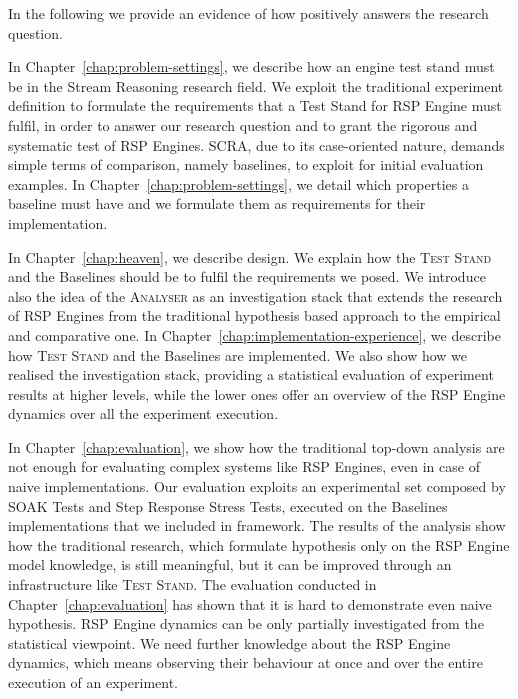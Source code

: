 \noindent In the following we provide an evidence of how \name positively answers the research question.

In Chapter~\ref{chap:problem-settings}, we describe how an engine test stand must be in the Stream Reasoning research field. We exploit the traditional experiment definition to formulate the requirements that a Test Stand for RSP Engine must fulfil, in order to answer our research question and to grant the rigorous and systematic test of RSP Engines. SCRA, due to its case-oriented nature, demands simple terms of comparison, namely baselines, to exploit for initial evaluation examples. In Chapter~\ref{chap:problem-settings}, we detail which properties a baseline must have and we formulate them as requirements for their implementation.


In Chapter~\ref{chap:heaven}, we describe \name design. We explain how the \textsc{Test Stand} and the Baselines should be to fulfil the requirements we posed. We introduce also the idea of the \textsc{Analyser} as an investigation stack that extends the research of RSP Engines from the traditional hypothesis based approach to the empirical and comparative one. In Chapter~\ref{chap:implementation-experience}, we describe how \name \textsc{Test Stand} and the Baselines are implemented. We also show how we realised the investigation stack, providing a statistical evaluation of experiment results at higher levels, while the lower ones offer an overview of the RSP Engine dynamics over all the experiment execution.

In Chapter~\ref{chap:evaluation}, we show how the traditional top-down analysis are not enough for evaluating complex systems like RSP Engines, even in case of naive implementations. Our evaluation exploits an experimental set composed by SOAK Tests and Step Response Stress Tests, executed on the Baselines implementations that we included in \name framework. The results of the analysis show how the traditional research, which formulate hypothesis only on the RSP Engine model knowledge, is still meaningful, but it can be improved through an infrastructure like \name \textsc{Test Stand}. The evaluation conducted in Chapter~\ref{chap:evaluation} has shown that it is hard to demonstrate even naive hypothesis. RSP Engine dynamics can be only partially investigated from the statistical viewpoint. We need further knowledge about the RSP Engine dynamics, which means observing their behaviour at once and over the entire execution of an experiment. %

